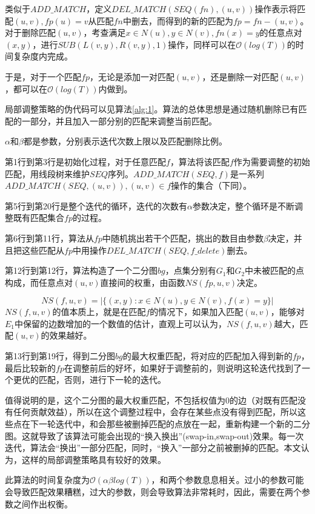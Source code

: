 类似于$ADD\_MATCH$，定义$DEL\_MATCH(SEQ(fn),(u,v))$操作表示将匹配$(u,v),fp(u)=v$从匹配$fn$中删去，而得到的新的匹配为$fp=fn-{(u,v)}$。对于删除匹配$(u,v)$，考查满足$x\in N(u),y\in N(v),fn(x)=y$的任意点对$(x,y)$，进行$SUB(L(v,y),R(v,y),1)$操作，同样可以在$\mathcal{O}(log(T))$的时间复杂度内完成。

于是，对于一个匹配$fp$，无论是添加一对匹配$(u,v)$，还是删除一对匹配$(u,v)$，都可以在$\mathcal{O}(log(T))$内做到。

局部调整策略的伪代码可以见算法\ref{alg:1}。算法的总体思想是通过随机删除已有匹配的一部分，并且加入一部分别的匹配来调整当前匹配。

$\alpha$和$\beta$都是参数，分别表示迭代次数上限以及匹配删除比例。

第1行到第3行是初始化过程，对于任意匹配$f$，算法将该匹配$f$作为需要调整的初始匹配，用线段树来维护$SEQ$序列。$ADD\_MATCH(SEQ,f)$是一系列$ADD\_MATCH(SEQ,(u,v)),(u,v)\in f$操作的集合（下同）。

第5行到第20行是整个迭代的循环，迭代的次数有$\alpha$参数决定，整个循环是不断调整既有匹配集合$fp$的过程。

第6行到第11行，算法从$fp$中随机挑出若干个匹配，挑出的数目由参数$\beta$决定，并且把这些匹配从$fp$中用操作$DEL\_MATCH(SEQ,f\_delete)$删去。

第12行到第12行，算法构造了一个二分图$bg$，点集分别有$G_1$和$G_2$中未被匹配的点构成，而任意点对$(u,v)$直接间的权重，由函数$NS(fp,u,v)$决定。

\begin{equation}\label{myworknsdefine}
    NS(f,u,v)=|\{(x,y):x\in N(u),y\in N(v),f(x)=y\}|
\end{equation}
$NS(f,u,v)$的值本质上，就是在匹配$f$的情况下，如果加入匹配$(u,v)$，能够对$E_1$中保留的边数增加的一个数值的估计，直观上可以认为，$NS(f,u,v)$越大，匹配$(u,v)$的效果越好。

第13行到第19行，得到二分图$bg$的最大权重匹配，将对应的匹配加入得到新的$fp$，最后比较新的$fp$在调整前后的好坏，如果好于调整前的，则说明这轮迭代找到了一个更优的匹配，否则，进行下一轮的迭代。

值得说明的是，这个二分图的最大权重匹配，不包括权值为0的边（对既有匹配没有任何贡献效益），所以在这个调整过程中，会存在某些点没有得到匹配，所以这些点在下一轮迭代中，和会那些被删掉匹配的点放在一起，重新构建一个新的二分图。这就导致了该算法可能会出现的“换入换出”(swap-in,swap-out)效果。每一次迭代，算法会“换出”一部分匹配，同时，“换入”一部分之前被删掉的匹配。本文认为，这样的局部调整策略具有较好的效果。

此算法的时间复杂度为$\mathcal{O}(\alpha\beta log(T))$，和两个参数息息相关。过小的参数可能会导致匹配效果糟糕，过大的参数，则会导致算法非常耗时，因此，需要在两个参数之间作出权衡。

